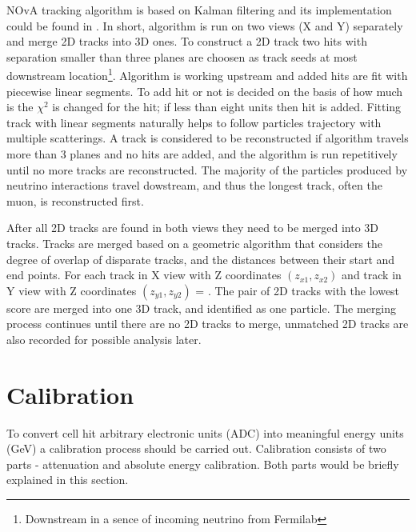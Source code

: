 NOvA tracking algorithm is based on Kalman filtering \cite{Kalman} and its implementation could be found 
in \cite{Nick}. In short, algorithm is run on two views (X and Y) separately and merge 2D tracks into
3D ones. To construct a 2D track two hits with separation smaller than three planes are choosen as track 
seeds at most downstream location\footnote{Downstream in a sence of incoming neutrino from Fermilab}. 
Algorithm is working upstream and added hits are fit with piecewise linear segments. To add hit or not 
is decided on the basis of how much is the $\chi^2$ is changed for the hit; if less than eight units 
then hit is added. Fitting track with linear segments naturally helps to follow particles trajectory 
with multiple scatterings. A track is considered to be reconstructed if algorithm travels more than 3 planes
and no hits are added, and the algorithm is run repetitively until no more tracks are reconstructed. 
The majority of the particles produced by neutrino interactions travel dowstream, and thus the longest 
track, often the muon, is reconstructed first.

After all 2D tracks are found in both views they need to be merged into 3D tracks. Tracks are merged based on
a geometric algorithm that considers the degree of overlap of disparate tracks, and the distances between
their start and end points. For each track in X view with Z coordinates $(z_{x1}, z_{x2})$ and track in Y view with
Z coordinates $(z_{y1}, z_{y2})$
\be
{} = .
\ee
The pair of 2D tracks with the lowest score are merged into one 3D track, and identified as one particle.
The merging process continues until there are no 2D tracks to merge, unmatched 2D tracks are also recorded
for possible analysis later.

\section{Calibration}
To convert cell hit arbitrary electronic units (ADC) into meaningful energy units (GeV) a calibration 
process should be carried out. Calibration consists of two parts - attenuation and absolute energy calibration. 
Both parts would be briefly explained in this section.

